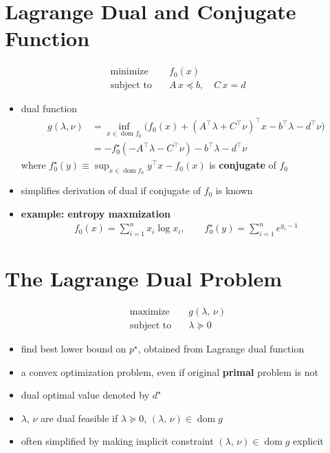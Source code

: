 \documentclass[11pt]{extarticle}
\newcommand{\ds}{\displaystyle}
\DeclareMathOperator*{\dom}{dom}
\theoremstyle{definition}
\begin{document}
\newpage

\section*{Lagrange Dual and Conjugate Function}
\begin{align*}
  \text{minimize}\quad & f_0(x) \\
  \text{subject to}\quad & A\,x\preccurlyeq b,\quad C\,x = d
\end{align*}
\begin{itemize}
  \item dual function 
    \begin{align*}
      g(\lambda, \nu) &= \inf_{x\in\dom{f_0}}\Big(f_0(x) + (A^\top\lambda + C^\top\nu)^\top x - b^\top\lambda - d^\top\nu\Big) \\
                      &= -f_0^\star(-A^\top\lambda - C^\top\nu) - b^\top\lambda - d^\top\nu
    \end{align*}
    where $\ds f_0^\star(y)\equiv\sup_{x\in\dom f_0} y^\top x - f_0(x)$ is {\bf conjugate} of $f_0$
  \item simplifies derivation of dual if conjugate of $f_0$ is known
  \item {\bf example: entropy maxmization}
    \begin{align*}
      f_0(x) = \sum_{i = 1}^n x_i\log x_i, \qquad f_0^\star(y) = \sum_{i = 1}^n e^{y_i - 1}
    \end{align*}
\end{itemize}

\newpage

\section*{The Lagrange Dual Problem}
\begin{align*}
  \text{maximize}\quad & g(\lambda,\,\nu) \\
  \text{subject to}\quad & \lambda\succcurlyeq 0
\end{align*}
\begin{itemize}
  \item find best lower bound on $\ds p^\star$, obtained from Lagrange dual function
  \item a convex optimization problem, even if original {\bf primal} problem is not
  \item dual optimal value denoted by $\ds d^\star$
  \item $\lambda$, $\nu$ are dual feasible if $\ds\lambda\succcurlyeq 0$, $\ds(\lambda,\,\nu)\in\dom g$
  \item often simplified by making implicit constraint $\ds (\lambda,\,\nu)\in\dom g$ explicit
\end{itemize}
\end{document}
